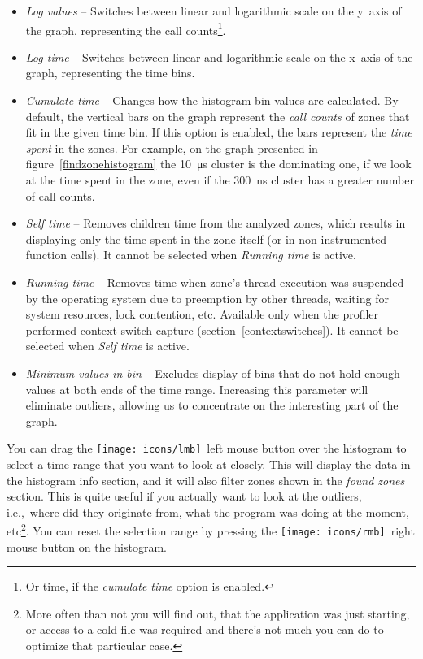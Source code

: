 \documentclass[hidelinks,titlepage,a4paper,twoside]{article}
\newcommand{\LMB}{\texttt{[image: icons/lmb]}}
\newcommand{\RMB}{\texttt{[image: icons/rmb]}}
\begin{document}
\begin{itemize}
\item \emph{Log values} -- Switches between linear and logarithmic scale on the y~axis of the graph, representing the call counts\footnote{Or time, if the \emph{cumulate time} option is enabled.}.
\item \emph{Log time} -- Switches between linear and logarithmic scale on the x~axis of the graph, representing the time bins.
\item \emph{Cumulate time} -- Changes how the histogram bin values are calculated. By default, the vertical bars on the graph represent the \emph{call counts} of zones that fit in the given time bin. If this option is enabled, the bars represent the \emph{time spent} in the zones. For example, on the graph presented in figure~\ref{findzonehistogram} the 10~\si{\micro\second} cluster is the dominating one, if we look at the time spent in the zone, even if the 300~\si{\nano\second} cluster has a greater number of call counts.
\item \emph{Self time} -- Removes children time from the analyzed zones, which results in displaying only the time spent in the zone itself (or in non-instrumented function calls). It cannot be selected when \emph{Running time} is active.
\item \emph{Running time} -- Removes time when zone's thread execution was suspended by the operating system due to preemption by other threads, waiting for system resources, lock contention, etc. Available only when the profiler performed context switch capture (section~\ref{contextswitches}). It cannot be selected when \emph{Self time} is active.
\item \emph{Minimum values in bin} -- Excludes display of bins that do not hold enough values at both ends of the time range. Increasing this parameter will eliminate outliers, allowing us to concentrate on the interesting part of the graph.
\end{itemize}

You can drag the \LMB{}~left mouse button over the histogram to select a time range that you want to look at closely. This will display the data in the histogram info section, and it will also filter zones shown in the \emph{found zones} section. This is quite useful if you actually want to look at the outliers, i.e.,\ where did they originate from, what the program was doing at the moment, etc\footnote{More often than not you will find out, that the application was just starting, or access to a cold file was required and there's not much you can do to optimize that particular case.}. You can reset the selection range by pressing the \RMB{}~right mouse button on the histogram.
\end{document}
